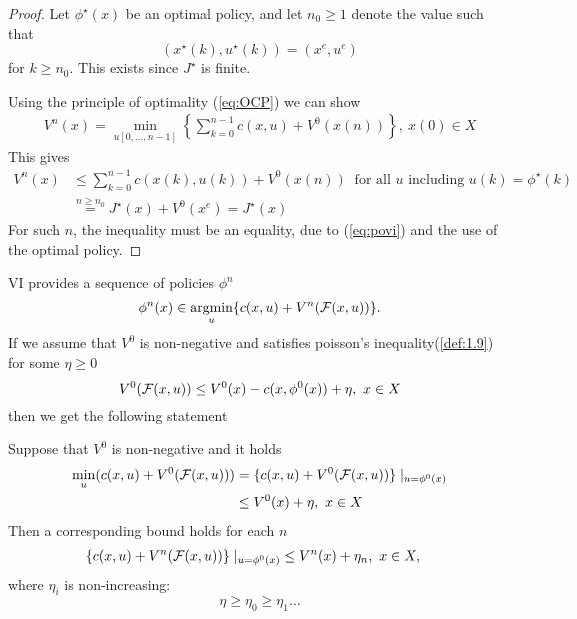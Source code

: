 \begin{proof}
    Let \(\phi^\star(x)\) be an optimal policy, and let 
    \(n_0\geq 1\) denote the value such that 
    \[(x^\star(k),u^\star(k))=(x^e,u^e)\]
    for \(k\geq n_0\). This exists since \(J^\star\) is finite.

    Using the principle of optimality (\ref{eq:OCP}) %
     we can show
    \begin{align}\label{eq:povi}
        V^n(x)=\min_{u[0,\dots,n-1]} \left\{\sum_{k=0}^{n-1} c(x,u)+V^0(x(n)) \right\},\ x(0)\in X 
    \end{align}
    This gives 
    \begin{align*}
        V^n(x) & \leq \sum_{k=0}^{n-1}c(x(k),u(k))+V^0(x(n))\ \text{ for all } u \text{ including }u(k)=\phi^\star(k) \\
               &\stackrel{n\geq n_0}{=}J^\star(x)+V^0(x^e)=J^\star(x)
    \end{align*}
    For such \(n\), the inequality must be an equality, due to (\ref{eq:povi}) and the use 
    of the optimal policy.
\end{proof}

VI provides a sequence of policies \(\phi^n\)
\[\phi^n(x)\in\operatorname*{\text{argmin}}_{u}\{c(x,u)+V^n(\mathcal{F}(x,u))\}.\]
If we assume that \(V^0\) is non-negative and satisfies poisson's inequality(\ref{def:1.9}) for some 
\(\eta\geq 0\)
\[V^0(\mathcal{F}(x,u))\leq V^0(x)-c(x,\phi^0(x))+\eta,\ x\in X\]
then we get the following statement 
\begin{proposition}\label{prop:1.16}
    Suppose that \(V^0\) is non-negative and it holds 
    \begin{align*}
        \min_u (c(x,u)+V^0(\mathcal{F}(x,u)))&=\{c(x,u)+V^0(\mathcal{F}(x,u))\}\mid_{u=\phi^0(x)}\\
        &\leq V^0(x)+\eta,\ x\in X
    \end{align*}
    Then a corresponding bound holds for each \(n\)
    \begin{align*}
        \{c(x,u)+V^n(\mathcal{F}(x,u))\}\mid_{u=\phi^0(x)} & \leq V^n(x)+\eta_n,\ x\in X,
    \end{align*}
    where \(\eta_i\) is non-increasing:
    \[\eta\geq \eta_0\geq \eta_1\dots\]
\end{proposition}

